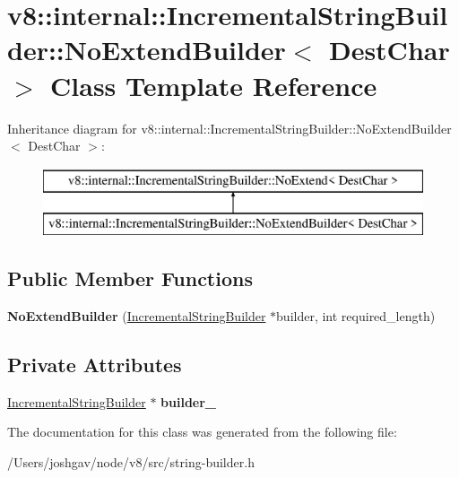 \hypertarget{classv8_1_1internal_1_1_incremental_string_builder_1_1_no_extend_builder}{}\section{v8\+:\+:internal\+:\+:Incremental\+String\+Builder\+:\+:No\+Extend\+Builder$<$ Dest\+Char $>$ Class Template Reference}
\label{classv8_1_1internal_1_1_incremental_string_builder_1_1_no_extend_builder}
Inheritance diagram for v8\+:\+:internal\+:\+:Incremental\+String\+Builder\+:\+:No\+Extend\+Builder$<$ Dest\+Char $>$\+:\begin{figure}[H]
\begin{center}
\leavevmode
\includegraphics[height=2.000000cm]{classv8_1_1internal_1_1_incremental_string_builder_1_1_no_extend_builder}
\end{center}
\end{figure}
\subsection*{Public Member Functions}
\begin{DoxyCompactItemize}
\item 
{\bfseries No\+Extend\+Builder} (\hyperlink{classv8_1_1internal_1_1_incremental_string_builder}{Incremental\+String\+Builder} $\ast$builder, int required\+\_\+length)\hypertarget{classv8_1_1internal_1_1_incremental_string_builder_1_1_no_extend_builder_a69a81a8b0da6c0dd8fa4503040ce76b6}{}\label{classv8_1_1internal_1_1_incremental_string_builder_1_1_no_extend_builder_a69a81a8b0da6c0dd8fa4503040ce76b6}

\end{DoxyCompactItemize}
\subsection*{Private Attributes}
\begin{DoxyCompactItemize}
\item 
\hyperlink{classv8_1_1internal_1_1_incremental_string_builder}{Incremental\+String\+Builder} $\ast$ {\bfseries builder\+\_\+}\hypertarget{classv8_1_1internal_1_1_incremental_string_builder_1_1_no_extend_builder_a7d214456971b1957cd514f60478b4f1a}{}\label{classv8_1_1internal_1_1_incremental_string_builder_1_1_no_extend_builder_a7d214456971b1957cd514f60478b4f1a}

\end{DoxyCompactItemize}


The documentation for this class was generated from the following file\+:\begin{DoxyCompactItemize}
\item 
/\+Users/joshgav/node/v8/src/string-\/builder.\+h\end{DoxyCompactItemize}

